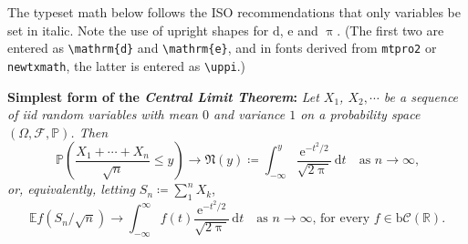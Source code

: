 \documentclass{article}
\def\Pr{\ensuremath{\mathbb{P}}}
\def\d{\mathrm{d}}
\begin{document}
\thispagestyle{empty}
\lipsum[1]
The typeset math below follows the ISO recommendations that only variables
be set in italic. Note the use of upright shapes for $\d$, $\mathrm{e}$
and $\uppi$. (The first two are entered as \verb|\mathrm{d}| and
\verb|\mathrm{e}|, and in fonts derived from {\tt mtpro2} or {\tt newtxmath},
 the latter is entered as \verb|\uppi|.)

\textbf{Simplest form of the \textit{Central Limit Theorem}:} \textit{Let
$X_1$, $X_2,\cdots$ be a sequence of iid random variables with mean $0$ 
and variance $1$ on a probability space $(\Omega,\mathcal{F},\Pr)$. Then}
\[\Pr\left(\frac{X_1+\cdots+X_n}{\sqrt{n}}\le y\right)\to\mathfrak{N}(y)\coloneq
\int_{-\infty}^y \frac{\mathrm{e}^{-t^2/2}}{\sqrt{2\uppi}}\,
\mathrm{d}t\quad\mbox{as $n\to\infty$,}\]
\textit{or, equivalently, letting} $S_n\coloneq\sum_1^n X_k$,
\[\mathbb{E} f\left(S_n/\sqrt{n}\right)\to \int_{-\infty}^\infty f(t)
\frac{\mathrm{e}^{-t^2/2}}{\sqrt{2\uppi}}\,\mathrm{d}t
\quad\mbox{as $n\to\infty$, for every $f\in\mathrm{b}
\mathcal{C}(\mathbb{R})$.}\]
\end{document}
